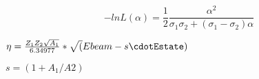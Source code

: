 \documentclass{article}
\begin{document}
\[ -lnL(\alpha) = \frac{1}{2} \frac{\alpha^2}{\sigma_1\sigma_2 + (\sigma_1 - \sigma_2)\alpha} \]
\pagebreak

$ \eta=\frac{Z_1Z_2\sqrt{A_1}}{6.34977} * \sqrt(Ebeam - s\cdotEstate) $
\pagebreak

$ s = (1 + A_1/A2)$
\pagebreak
\end{document}
